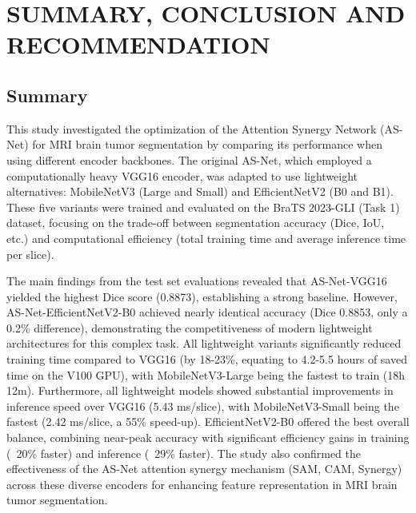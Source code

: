 \chapter{SUMMARY, CONCLUSION AND RECOMMENDATION}

\section{Summary}
This study investigated the optimization of the Attention Synergy Network (AS-Net) for MRI brain tumor segmentation by comparing its performance when using different encoder backbones. The original AS-Net, which employed a computationally heavy VGG16 encoder, was adapted to use lightweight alternatives: MobileNetV3 (Large and Small) and EfficientNetV2 (B0 and B1). These five variants were trained and evaluated on the BraTS 2023-GLI (Task 1) dataset, focusing on the trade-off between segmentation accuracy (Dice, IoU, etc.) and computational efficiency (total training time and average inference time per slice).

The main findings from the test set evaluations revealed that AS-Net-VGG16 yielded the highest Dice score (0.8873), establishing a strong baseline. However, AS-Net-EfficientNetV2-B0 achieved nearly identical accuracy (Dice 0.8853, only a 0.2\% difference), demonstrating the competitiveness of modern lightweight architectures for this complex task. All lightweight variants significantly reduced training time compared to VGG16 (by 18-23\%, equating to 4.2-5.5 hours of saved time on the V100 GPU), with MobileNetV3-Large being the fastest to train (18h 12m). Furthermore, all lightweight models showed substantial improvements in inference speed over VGG16 (5.43 ms/slice), with MobileNetV3-Small being the fastest (2.42 ms/slice, a 55\% speed-up). EfficientNetV2-B0 offered the best overall balance, combining near-peak accuracy with significant efficiency gains in training (~20\% faster) and inference (~29\% faster). The study also confirmed the effectiveness of the AS-Net attention synergy mechanism (SAM, CAM, Synergy) across these diverse encoders for enhancing feature representation in MRI brain tumor segmentation.

